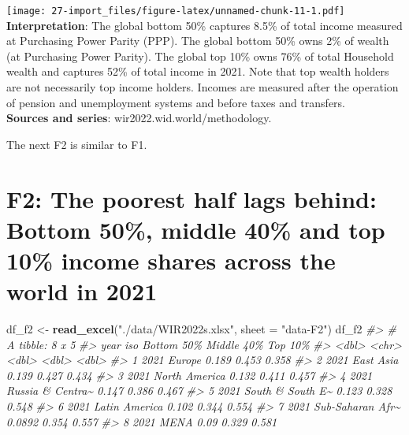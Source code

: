 \documentclass[
  xelatex, ja=standard]{bxjsbook}
\newenvironment{Shaded}{\begin{snugshade}}{\end{snugshade}}
\newcommand{\AttributeTok}[1]{\textcolor[rgb]{0.13,0.29,0.53}{#1}}
\newcommand{\CommentTok}[1]{\textcolor[rgb]{0.56,0.35,0.01}{\textit{#1}}}
\newcommand{\FunctionTok}[1]{\textcolor[rgb]{0.13,0.29,0.53}{\textbf{#1}}}
\newcommand{\NormalTok}[1]{#1}
\newcommand{\OtherTok}[1]{\textcolor[rgb]{0.56,0.35,0.01}{#1}}
\newcommand{\StringTok}[1]{\textcolor[rgb]{0.31,0.60,0.02}{#1}}
\theoremstyle{definition}
\theoremstyle{definition}
\theoremstyle{definition}
\theoremstyle{definition}
\theoremstyle{remark}
\begin{document}
\texttt{[image: 27-import\_files/figure-latex/unnamed-chunk-11-1.pdf]} \textbf{Interpretation}: The global bottom 50\% captures 8.5\% of total income measured at Purchasing Power Parity (PPP). The global bottom 50\% owns 2\% of wealth (at Purchasing Power Parity). The global top 10\% owns 76\% of total Household wealth and captures 52\% of total income in 2021. Note that top wealth holders are not necessarily top income holders. Incomes are measured after the operation of pension and unemployment systems and before taxes and transfers.\\
\textbf{Sources and series}: wir2022.wid.world/methodology.

The next F2 is similar to F1.

\hypertarget{f2-the-poorest-half-lags-behind-bottom-50-middle-40-and-top-10-income-shares-across-the-world-in-2021}{%
\section{F2: The poorest half lags behind: Bottom 50\%, middle 40\% and top 10\% income shares across the world in 2021}\label{f2-the-poorest-half-lags-behind-bottom-50-middle-40-and-top-10-income-shares-across-the-world-in-2021}}

\begin{Shaded}
\begin{Highlighting}[]
\NormalTok{df\_f2 }\OtherTok{\textless{}{-}} \FunctionTok{read\_excel}\NormalTok{(}\StringTok{"./data/WIR2022s.xlsx"}\NormalTok{, }\AttributeTok{sheet =} \StringTok{"data{-}F2"}\NormalTok{)}
\NormalTok{df\_f2}
\CommentTok{\#\textgreater{} \# A tibble: 8 x 5}
\CommentTok{\#\textgreater{}    year iso              \textasciigrave{}Bottom 50\%\textasciigrave{} \textasciigrave{}Middle 40\%\textasciigrave{} \textasciigrave{}Top 10\%\textasciigrave{}}
\CommentTok{\#\textgreater{}   \textless{}dbl\textgreater{} \textless{}chr\textgreater{}                   \textless{}dbl\textgreater{}        \textless{}dbl\textgreater{}     \textless{}dbl\textgreater{}}
\CommentTok{\#\textgreater{} 1  2021 Europe                 0.189         0.453     0.358}
\CommentTok{\#\textgreater{} 2  2021 East Asia              0.139         0.427     0.434}
\CommentTok{\#\textgreater{} 3  2021 North America          0.132         0.411     0.457}
\CommentTok{\#\textgreater{} 4  2021 Russia \& Centra\textasciitilde{}       0.147         0.386     0.467}
\CommentTok{\#\textgreater{} 5  2021 South \& South E\textasciitilde{}       0.123         0.328     0.548}
\CommentTok{\#\textgreater{} 6  2021 Latin America          0.102         0.344     0.554}
\CommentTok{\#\textgreater{} 7  2021 Sub{-}Saharan Afr\textasciitilde{}       0.0892        0.354     0.557}
\CommentTok{\#\textgreater{} 8  2021 MENA                   0.09          0.329     0.581}
\end{Highlighting}
\end{Shaded}
\end{document}
